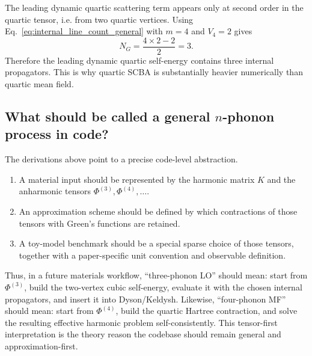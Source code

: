 The leading dynamic quartic scattering term appears only at second order in the quartic tensor, i.e. from two quartic vertices. Using Eq.~\eqref{eq:internal_line_count_general} with $m=4$ and $V_4=2$ gives
\begin{equation}
    N_G = \frac{4\times 2 - 2}{2} = 3.
\end{equation}
Therefore the leading dynamic quartic self-energy contains three internal propagators. This is why quartic SCBA is substantially heavier numerically than quartic mean field.

\subsection{What should be called a general \texorpdfstring{$n$}{n}-phonon process in code?}
The derivations above point to a precise code-level abstraction.
\begin{enumerate}[label=\arabic*.]
\item A material input should be represented by the harmonic matrix $K$ and the anharmonic tensors $\Phi^{(3)}, \Phi^{(4)}, \ldots$.
\item An approximation scheme should be defined by which contractions of those tensors with Green's functions are retained.
\item A toy-model benchmark should be a special sparse choice of those tensors, together with a paper-specific unit convention and observable definition.
\end{enumerate}
Thus, in a future materials workflow, ``three-phonon LO'' should mean: start from $\Phi^{(3)}$, build the two-vertex cubic self-energy, evaluate it with the chosen internal propagators, and insert it into Dyson/Keldysh. Likewise, ``four-phonon MF'' should mean: start from $\Phi^{(4)}$, build the quartic Hartree contraction, and solve the resulting effective harmonic problem self-consistently. This tensor-first interpretation is the theory reason the codebase should remain general and approximation-first.
